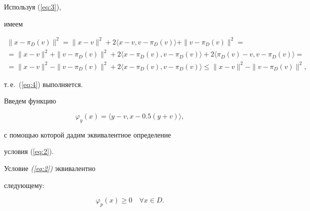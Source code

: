 \begin{pf} Используя (\ref{eq:3}),


имеем


\begin{gather*}


\|x -\pi_D(v)\|^2  =  \|x-v\|^2


+ 2 \langle x -v, v-\pi_D(v)\rangle + \| v- \pi_D(v)\|^2= \\


%


 = \|x-v\|^2 + \| v- \pi_D(v)\|^2


    + 2 \langle x -\pi_D(v), v-\pi_D(v)\rangle 


 + 2 \langle \pi_D(v) -v, v-\pi_D(v)\rangle =\\


 = \|x-v\|^2 - \| v- \pi_D(v)\|^2


    + 2 \langle x -\pi_D(v), v-\pi_D(v)\rangle 


 \leq \|x-v\|^2 - \| v- \pi_D(v)\|^2,


\end{gather*}


т.\,е.~(\ref{eq:4}) выполняется.


\end{pf}





Введем функцию


$$


\varphi_{y}(x)= \langle y-v,x-0.5(y+v) \rangle,


$$


с помощью которой дадим эквивалентное определение


условия (\ref{eq:2}).





\begin{lem} \label{lm:2}


 Условие {\em (\ref{eq:2})} эквивалентно


 следующему$:$


\begin{equation} \label{eq:5}


 \varphi_{p}(x) \geq 0 \quad \forall x\in D.


\end{equation}


\end{lem}





